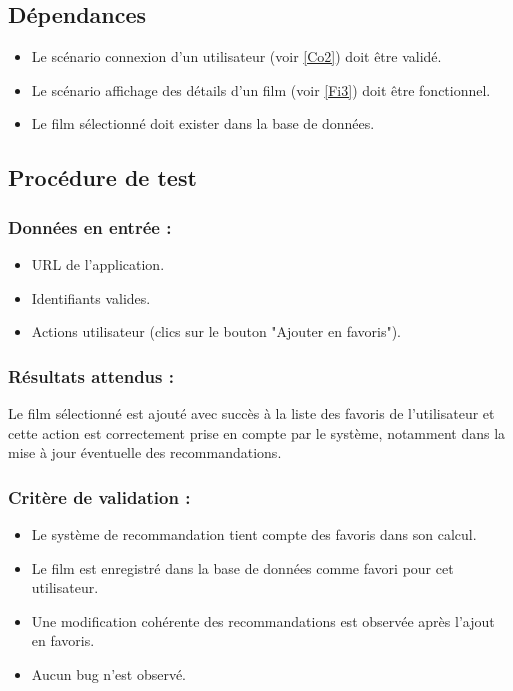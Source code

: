\documentclass[a4paper,12pt]{report}
\begin{document}
\subsection*{Dépendances}
\begin{itemize}
    \item Le scénario connexion d'un utilisateur (voir \ref{Co2}) doit être validé.
    \item Le scénario affichage des détails d'un film (voir \ref{Fi3}) doit être fonctionnel. 
    \item Le film sélectionné doit exister dans la base de données.
\end{itemize}

\subsection*{Procédure de test}
\subsubsection{Données en entrée :}
\begin{itemize}
    \item URL de l’application.
    \item Identifiants valides.
    \item Actions utilisateur (clics sur le bouton "Ajouter en favoris").
\end{itemize}
 \newpage
\subsubsection{Résultats attendus :}
Le film sélectionné est ajouté avec succès à la liste des favoris de l’utilisateur et cette action est correctement prise en compte par le système, notamment dans la mise à jour éventuelle des recommandations.
\subsubsection{Critère de validation :}
\begin{itemize}
    \item Le système de recommandation tient compte des favoris dans son calcul.
    \item Le film est enregistré dans la base de données comme favori pour cet utilisateur.
    \item Une modification cohérente des recommandations est observée après l'ajout en favoris.
    \item Aucun bug n'est observé.
\end{itemize}
\end{document}
